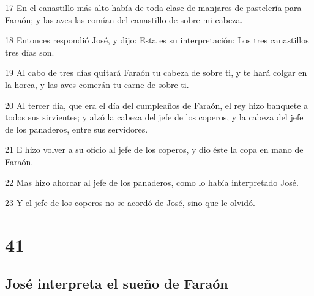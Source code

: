 \par 17 En el canastillo más alto había de toda clase de manjares de pastelería para Faraón; y las aves las comían del canastillo de sobre mi cabeza.
\par 18 Entonces respondió José, y dijo: Esta es su interpretación: Los tres canastillos tres días son.
\par 19 Al cabo de tres días quitará Faraón tu cabeza de sobre ti, y te hará colgar en la horca, y las aves comerán tu carne de sobre ti.
\par 20 Al tercer día, que era el día del cumpleaños de Faraón, el rey hizo banquete a todos sus sirvientes; y alzó la cabeza del jefe de los coperos, y la cabeza del jefe de los panaderos, entre sus servidores.
\par 21 E hizo volver a su oficio al jefe de los coperos, y dio éste la copa en mano de Faraón.
\par 22 Mas hizo ahorcar al jefe de los panaderos, como lo había interpretado José.
\par 23 Y el jefe de los coperos no se acordó de José, sino que le olvidó.

\chapter{41}

\section*{José interpreta el sueño de Faraón}

